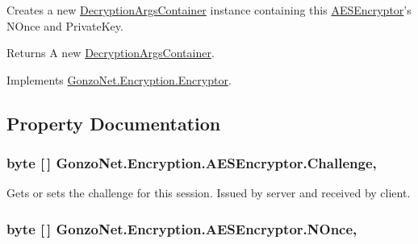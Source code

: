 Creates a new \hyperlink{class_gonzo_net_1_1_encryption_1_1_decryption_args_container}{Decryption\+Args\+Container} instance containing this \hyperlink{class_gonzo_net_1_1_encryption_1_1_a_e_s_encryptor}{A\+E\+S\+Encryptor}'s N\+Once and Private\+Key. 

\begin{DoxyReturn}{Returns}
A new \hyperlink{class_gonzo_net_1_1_encryption_1_1_decryption_args_container}{Decryption\+Args\+Container}.
\end{DoxyReturn}


Implements \hyperlink{class_gonzo_net_1_1_encryption_1_1_encryptor_a885125d3d4fd76914f77a9507c948d1b}{Gonzo\+Net.\+Encryption.\+Encryptor}.



\subsection{Property Documentation}
\hypertarget{class_gonzo_net_1_1_encryption_1_1_a_e_s_encryptor_acd5c42b066f3e2b132289d40bfcdd6f0}{
\subsubsection[{Challenge}]{\setlength{\rightskip}{0pt plus 5cm}byte \mbox{[}$\,$\mbox{]} Gonzo\+Net.\+Encryption.\+A\+E\+S\+Encryptor.\+Challenge\hspace{0.3cm}{\ttfamily [get]}, {\ttfamily [set]}}}\label{class_gonzo_net_1_1_encryption_1_1_a_e_s_encryptor_acd5c42b066f3e2b132289d40bfcdd6f0}


Gets or sets the challenge for this session. Issued by server and received by client. 

\hypertarget{class_gonzo_net_1_1_encryption_1_1_a_e_s_encryptor_ac109cf9e6f31770e02f88724b7e55256}{
\subsubsection[{N\+Once}]{\setlength{\rightskip}{0pt plus 5cm}byte \mbox{[}$\,$\mbox{]} Gonzo\+Net.\+Encryption.\+A\+E\+S\+Encryptor.\+N\+Once\hspace{0.3cm}{\ttfamily [get]}, {\ttfamily [set]}}}\label{class_gonzo_net_1_1_encryption_1_1_a_e_s_encryptor_ac109cf9e6f31770e02f88724b7e55256}


